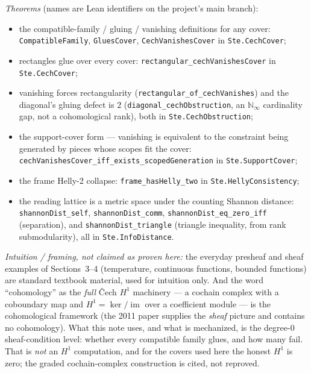 \documentclass[11pt]{article}
\newcommand{\code}[1]{\texttt{#1}}
\begin{document}
\emph{Theorems} (names are Lean identifiers on the project's main
branch):
\begin{itemize}
\item the compatible-family / gluing / vanishing definitions for any
  cover: \code{CompatibleFamily}, \code{GluesCover},
  \code{CechVanishesCover} in \code{Ste.CechCover};
\item rectangles glue over every cover:
  \code{rectangular\_cechVanishesCover} in \code{Ste.CechCover};
\item vanishing forces rectangularity
  (\code{rectangular\_of\_cechVanishes}) and the diagonal's gluing
  defect is $2$ (\code{diagonal\_cechObstruction}, an
  $\mathbb{N}_\infty$ cardinality gap, not a cohomological rank), both
  in \code{Ste.CechObstruction};
\item the support-cover form --- vanishing is equivalent to the
  constraint being generated by pieces whose scopes fit the cover:\\
  \code{cechVanishesCover\_iff\_exists\_scopedGeneration} in
  \code{Ste.SupportCover};
\item the frame Helly-2 collapse: \code{frame\_hasHelly\_two} in
  \code{Ste.HellyConsistency};
\item the reading lattice is a metric space under the counting Shannon
  distance: \code{shannonDist\_self}, \code{shannonDist\_comm},
  \code{shannonDist\_eq\_zero\_iff} (separation), and
  \code{shannonDist\_triangle} (triangle inequality, from rank
  submodularity), all in \code{Ste.InfoDistance}.
\end{itemize}

\emph{Intuition / framing, not claimed as proven here:} the everyday
presheaf and sheaf examples of Sections~3--4 (temperature, continuous
functions, bounded functions) are standard textbook material, used for
intuition only.  And the word ``cohomology'' as the \emph{full}
\v{C}ech $H^1$ machinery --- a cochain complex with a coboundary map
and $H^1 = \ker/\operatorname{im}$ over a coefficient module --- is the
\citet{abramsky2012cohomology} cohomological framework (the
\citeauthor{abramsky2011sheaf} 2011 paper supplies the \emph{sheaf}
picture and contains no cohomology).  What this note uses, and what is
mechanized, is the degree-$0$ sheaf-condition level: whether every
compatible family glues, and how many fail.  That is \emph{not} an
$H^1$ computation, and for the covers used here the honest $H^1$ is
zero; the graded cochain-complex construction is cited, not reproved.
\end{document}
